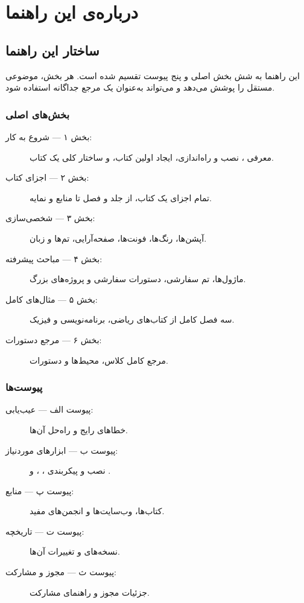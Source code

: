 
\chapter*{درباره‌ی این راهنما}
\label{ch:about}

\section*{ساختار این راهنما}

این راهنما به شش بخش اصلی و پنج پیوست تقسیم شده
است. هر بخش، موضوعی مستقل را پوشش می‌دهد و می‌تواند
به‌عنوان یک مرجع جداگانه استفاده شود.

\subsection*{بخش‌های اصلی}

\begin{description}
    \item[بخش ۱ — شروع به کار:] معرفی ،
    نصب و راه‌اندازی، ایجاد اولین کتاب، و ساختار
    کلی یک کتاب.

    \item[بخش ۲ — اجزای کتاب:] تمام اجزای یک کتاب،
    از جلد و فصل تا منابع و نمایه.

    \item[بخش ۳ — شخصی‌سازی:] آپشن‌ها، رنگ‌ها،
    فونت‌ها، صفحه‌آرایی، تم‌ها و زبان.

    \item[بخش ۴ — مباحث پیشرفته:] ماژول‌ها، تم سفارشی،
    دستورات سفارشی و پروژه‌های بزرگ.

    \item[بخش ۵ — مثال‌های کامل:] سه فصل کامل از
    کتاب‌های ریاضی، برنامه‌نویسی و فیزیک.

    \item[بخش ۶ — مرجع دستورات:] مرجع کامل کلاس،
    محیط‌ها و دستورات.
\end{description}

\subsection*{پیوست‌ها}

\begin{description}
    \item[پیوست الف — عیب‌یابی:] خطاهای رایج و
    راه‌حل آن‌ها.

    \item[پیوست ب — ابزارهای موردنیاز:] نصب و
    پیکربندی ، ،  و
    .

    \item[پیوست پ — منابع:] کتاب‌ها، وب‌سایت‌ها و
    انجمن‌های مفید.

    \item[پیوست ت — تاریخچه:] نسخه‌های 
    و تغییرات آن‌ها.

    \item[پیوست ث — مجوز و مشارکت:] جزئیات مجوز
    و راهنمای مشارکت.
\end{description}

